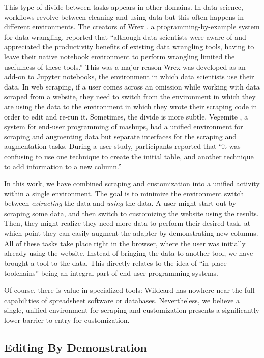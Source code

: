 \documentclass[sigconf,10pt]{acmart}
\begin{document}
This type of divide between tasks appears in other domains. In data
science, workflows revolve between cleaning and using data but this
often happens in different environments. The creators of Wrex
\citep{drosos2020}, a programming-by-example system for data wrangling,
reported that ``although data scientists were aware of and appreciated
the productivity benefits of existing data wrangling tools, having to
leave their native notebook environment to perform wrangling limited the
usefulness of these tools.'' This was a major reason Wrex was developed
as an add-on to Jupyter notebooks, the environment in which data
scientists use their data. In web scraping, if a user comes across an
omission while working with data scraped from a website, they need to
switch from the environment in which they are using the data to the
environment in which they wrote their scraping code in order to edit and
re-run it. Sometimes, the divide is more subtle. Vegemite
\citep{lin2009}, a system for end-user programming of mashups, had a
unified environment for scraping and augmenting data but separate
interfaces for the scraping and augmentation tasks. During a user study,
participants reported that ``it was confusing to use one technique to
create the initial table, and another technique to add information to a
new column.''

In this work, we have combined scraping and customization into a unified
activity within a single environment. The goal is to minimize the
environment switch between \emph{extracting} the data and \emph{using}
the data. A user might start out by scraping some data, and then switch
to customizing the website using the results. Then, they might realize
they need more data to perform their desired task, at which point they
can easily augment the adapter by demonstrating new columns. All of
these tasks take place right in the browser, where the user was
initially already using the website. Instead of bringing the data to
another tool, we have brought a tool to the data. This directly relates
to the idea of ``in-place toolchains'' \citep{zotero-60} being an
integral part of end-user programming systems.

Of course, there is value in specialized tools: Wildcard has nowhere
near the full capabilities of spreadsheet software or databases.
Nevertheless, we believe a single, unified environment for scraping and
customization presents a significantly lower barrier to entry for
customization.

\hypertarget{editing-by-demonstration-1}{%
\subsection{Editing By Demonstration}\label{editing-by-demonstration-1}}
\end{document}
